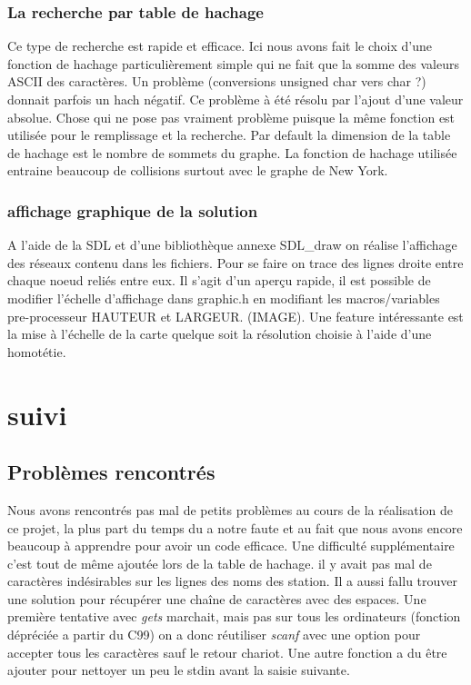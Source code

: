 \documentclass[12pt]{report}
\begin{document}
\subsection{La recherche par table de hachage}
Ce type de recherche est rapide et efficace. Ici nous avons fait le choix d'une fonction de hachage particulièrement simple qui ne fait que la somme des valeurs ASCII des caractères. Un problème (conversions unsigned char vers char ?) donnait parfois un hach négatif. Ce problème à été résolu par l'ajout d'une valeur absolue. Chose qui ne pose pas vraiment problème puisque la même fonction est utilisée pour le remplissage et la recherche. Par default la dimension de la table de hachage est le nombre de sommets du graphe. La fonction de hachage utilisée entraine beaucoup de collisions surtout avec le graphe de New York. 

\subsection{affichage graphique de la solution}
A l'aide de la SDL et d'une bibliothèque annexe SDL\_draw on réalise l'affichage des réseaux contenu dans les fichiers. Pour se faire on trace des lignes droite entre chaque noeud reliés entre eux. Il s'agit d'un aperçu rapide, il est possible de modifier l'échelle d'affichage dans graphic.h en modifiant les macros/variables pre-processeur HAUTEUR et LARGEUR. (IMAGE). Une feature intéressante est la mise à l'échelle de la carte quelque soit la résolution choisie à l'aide d'une homotétie. 
\chapter{suivi}
\section{Problèmes rencontrés}

Nous avons rencontrés pas mal de petits problèmes au cours de la réalisation de ce projet, la plus part du temps du a notre faute et au fait que nous avons encore beaucoup à apprendre pour avoir un code efficace. Une difficulté supplémentaire c'est tout de même ajoutée lors de la table de hachage. il y avait pas mal de caractères indésirables sur les lignes des noms des station. Il a aussi fallu trouver une solution pour récupérer une chaîne de caractères avec des espaces. Une première tentative avec \emph{gets} marchait, mais pas sur tous les ordinateurs (fonction dépréciée a partir du C99) on a donc réutiliser \emph{scanf} avec une option pour accepter tous les caractères sauf le retour chariot. Une autre fonction a du être ajouter pour nettoyer un peu le stdin avant la saisie suivante.
\end{document}

